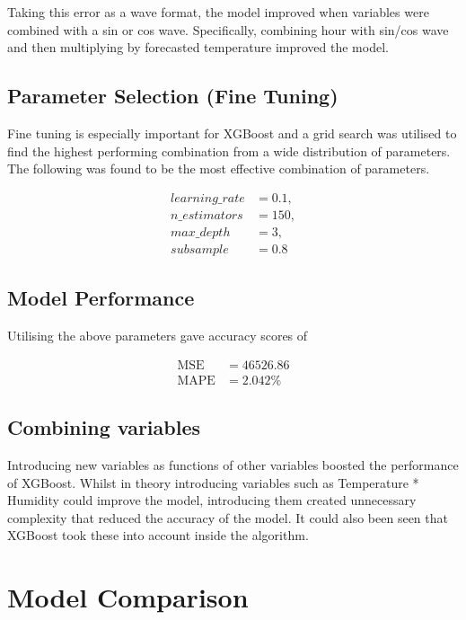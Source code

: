 \documentclass[mstat,12pt]{unswthesis}
\begin{document}
\bigskip

Taking this error as a wave format, the model improved when variables were combined with a sin or cos wave. Specifically, combining hour with sin/cos wave and then multiplying by forecasted temperature improved the model.

\subsection{Parameter Selection (Fine Tuning)}\label{parameter-selection-fine-tuning-1}

Fine tuning is especially important for XGBoost and a grid search was utilised to find the highest performing combination from a wide distribution of parameters. The following was found to be the most effective combination of parameters.

\begin{center}
\begin{align*}
learning\_rate &= 0.1,\\
n\_estimators &= 150,\\
max\_depth &= 3,\\
subsample &= 0.8
\end{align*}
\end{center}

\subsection{Model Performance}\label{model-performance-3}

Utilising the above parameters gave accuracy scores of

\begin{align*}
\text{MSE} &= 46526.86 \\
\text{MAPE} &= 2.042\%
\end{align*}

\subsection{Combining variables}\label{combining-variables}

Introducing new variables as functions of other variables boosted the performance of XGBoost. Whilst in theory introducing variables such as Temperature * Humidity could improve the model, introducing them created unnecessary complexity that reduced the accuracy of the model. It could also been seen that XGBoost took these into account inside the algorithm.

\section{Model Comparison}\label{model-comparison}
\end{document}
